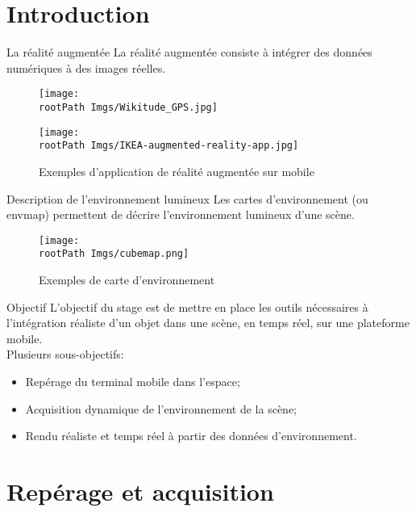 \documentclass{beamer}
\newcommand*{\rootPath}{}
\begin{document}
\frame{\titlepage}


\section{Introduction}

\begin{frame}{La réalité augmentée}
	La réalité augmentée consiste à intégrer des données numériques à des images réelles. 
	\begin{figure}
		\centering
		\texttt{[image: \\rootPath Imgs/Wikitude\_GPS.jpg]}

		\texttt{[image: \\rootPath Imgs/IKEA-augmented-reality-app.jpg]}
		\caption{Exemples d'application de réalité augmentée sur mobile}
	\end{figure}	
\end{frame}

\begin{frame}{Description de l'environnement lumineux}
	Les cartes d'environnement (ou envmap) permettent de décrire l'environnement lumineux d'une scène.
	\begin{figure}
		\centering
		\texttt{[image: \\rootPath Imgs/cubemap.png]}
		\caption{Exemples de carte d'environnement}
	\end{figure}	
\end{frame}

\begin{frame}{Objectif}
	L'objectif du stage est de mettre en place les outils nécessaires à l'intégration réaliste d'un objet dans une scène, en temps réel, sur une plateforme mobile.\\[.5cm]
	Plusieurs sous-objectifs:
	\begin{itemize}
		\item Repérage du terminal mobile dans l'espace;
		\item Acquisition dynamique de l'environnement de la scène;
		\item Rendu réaliste et temps réel à partir des données d'environnement.
	\end{itemize}
\end{frame}


\section{Repérage et acquisition}

\end{document}
